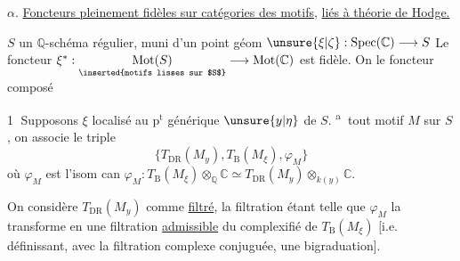 \textcircled{$\alpha$}. \uline{Foncteurs pleinement fidèles sur catégories des motifs}, \uline{liés à théorie de Hodge.}

$S$ un $\mathbb{Q}$-schéma régulier, muni d'un point géom $\unsure{\xi|\zeta}:\operatorname{Spec}(\mathbb{C})\longrightarrow S$
Le foncteur $\xi^*:\underset{\text{\inserted{motifs lisses sur $S$}}}{\operatorname{Mot}(S)}\longrightarrow\operatorname{Mot}(\mathbb{C})$ est fidèle. On  le foncteur composé

\textcircled{1}  Supposons $\xi$ localisé au $\mathrm{p}^{\mathrm t}$ générique $\unsure{y|\eta}$ de $S$.  \textsuperscript{\textcircled{a}}  tout motif $M$ sur $S$, on associe le triple
\[
\bigl\{T_{\mathrm{DR}}(M_y),T_{\mathrm B}(M_\xi),\varphi_M\bigr\}
\]
où $\varphi_M$ est l'isom can $\varphi_M:T_{\mathrm B}(M_\xi)\otimes_{\mathbb Q}\mathbb C\simeq T_{\mathrm{DR}}(M_y)\otimes_{k(y)}\mathbb C$.

On considère $T_{\mathrm{DR}}(M_y)$ comme \uline{filtré}, la filtration étant telle que $\varphi_M$ la transforme en une filtration \uline{admissible} du complexifié de $T_{\mathrm B}(M_\xi)$ [i.e. définissant, avec la filtration complexe conjuguée, une bigraduation].

